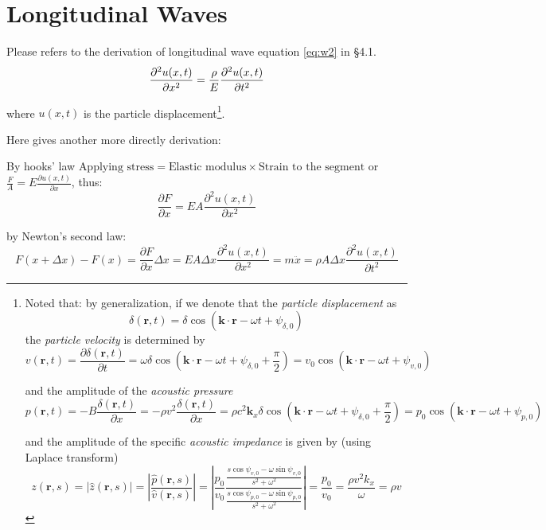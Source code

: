 \documentclass[UTF8]{book}
\begin{document}
\section{Longitudinal Waves}
Please refers to the derivation of longitudinal wave equation \eqref{eq:w2} in \S 4.1.
\begin{equation}
{\partial^2 u(x,t) \over \partial x^2 }={ \rho\over E}{\partial^2 u(x,t) \over \partial t^2}
\end{equation}

where $u(x,t)$ is the particle displacement\footnote{Noted that: by generalization, if we denote that the \emph{particle displacement} as \[\delta (\mathbf{r},t)=\delta \cos \left(\mathbf{k}\cdot \mathbf{r}-\omega t+\psi _{\delta ,0}\right)\]
the \emph{particle velocity} is determined by
\[v(\mathbf{r},t)=\frac{\partial \delta (\mathbf{r},t)}{\partial t}=\omega \delta \cos \left(\mathbf{k}\cdot \mathbf{r}-\omega t+\psi _{\delta ,0}+\frac{\pi }{2}\right)=v_0\cos \left(\mathbf{k}\cdot \mathbf{r}-\omega t+\psi _{v,0}\right)\] 

and the amplitude of the \emph{acoustic pressure}
\[p(\mathbf{r},t)=-B\frac{\delta (\mathbf{r},t)}{\partial x}=-\rho v^2\frac{\delta (\mathbf{r},t)}{\partial x}=\rho c^2\mathbf{k}_x\delta \cos \left(\mathbf{k}\cdot \mathbf{r}-\omega t+\psi _{\delta ,0}+\frac{\pi }{2}\right)=p_0\cos \left(\mathbf{k}\cdot \mathbf{r}-\omega t+\psi _{p,0}\right)\]

and the amplitude of the specific \emph{acoustic impedance} is given by (using Laplace transform)
\[z(\mathbf{r},s)=\left|\hat{z}(\mathbf{r},s)\right|=\left|\frac{\hat{p}(\mathbf{r},s)}{\hat{v}(\mathbf{r},s)}\right|=\left|\frac{p_0}{v_0}\frac{\frac{s\cos \psi _{v,0}-\omega \sin \psi _{v,0}}{s^2+\omega ^2}}{\frac{s\cos \psi _{p,0}-\omega \sin \psi _{p,0}}{s^2+\omega ^2}}\right|=\frac{p_0}{v_0}=\frac{\rho v^2k_x}{\omega }=\rho v\]}.

Here gives another more directly derivation:

By hooks' law $\text{Applying stress}= \text{Elastic modulus} \times \text{Strain to the segment}$ or $\frac{F}{A}=E\frac{\partial u(x,t)}{\partial x}$, thus:
\[\frac{\partial F}{\partial x}=EA\frac{\partial ^2u(x,t)}{\partial x^2}\]

by Newton's second law: 
\[F(x+\Delta x)-F(x)=\frac{\partial F}{\partial x}\Delta x=EA\Delta x\frac{\partial ^2u(x,t)}{\partial x^2}=m\ddot{x}=\rho A\Delta x\frac{\partial ^2u(x,t)}{\partial t^2}\]
\end{document}
